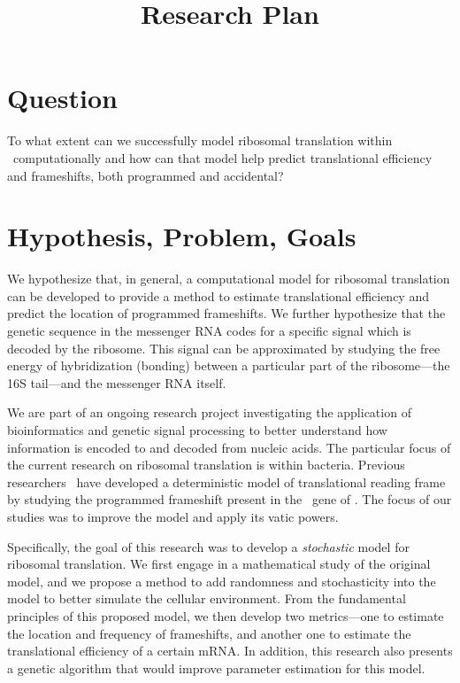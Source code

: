 \documentclass[article, oneside]{memoir}
\author{\BWFauthors}
\title{Research Plan}
\begin{document}
\nocite{*}
\maketitle
\section{Question}
To what extent can we successfully model ribosomal translation within
\ecoli\ computationally and how can that model help predict
translational efficiency and frameshifts, both programmed and
accidental?

\section{Hypothesis, Problem, Goals}
We hypothesize that, in general, a computational model for ribosomal
translation can be developed to provide a method to estimate translational
efficiency and predict the location of programmed frameshifts.  We further
hypothesize that the genetic sequence in the messenger RNA codes for a 
specific signal which is decoded by the ribosome.  This signal can be 
approximated by studying the free energy of hybridization (bonding) between
a particular part of the ribosome---the 16S tail---and the messenger RNA itself.

We are part of an ongoing research project
investigating the application of bioinformatics
and genetic signal processing to better understand how
information is encoded to and decoded from nucleic acids.  The particular
focus of the current research on ribosomal translation is within
bacteria.  Previous researchers~\cite{lalit:mechanics}
have developed a deterministic model
of translational reading frame by studying the
programmed frameshift present in the \prfB\ gene of \ecoli.  The focus
of our studies was to improve the model and apply its vatic powers.

Specifically, the goal of this research was to develop a 
\emph{stochastic} model for ribosomal translation.  We first engage in
a mathematical study of the original model, and we propose a method
to add randomness and stochasticity into the model to better simulate
the cellular environment.  From the fundamental principles of this
proposed model, we then develop two metrics---one to estimate the
location and frequency of frameshifts, and another one to estimate the
translational efficiency of a certain mRNA.  In addition, this research
also presents a genetic algorithm that would improve parameter estimation
for this model.
\end{document}
